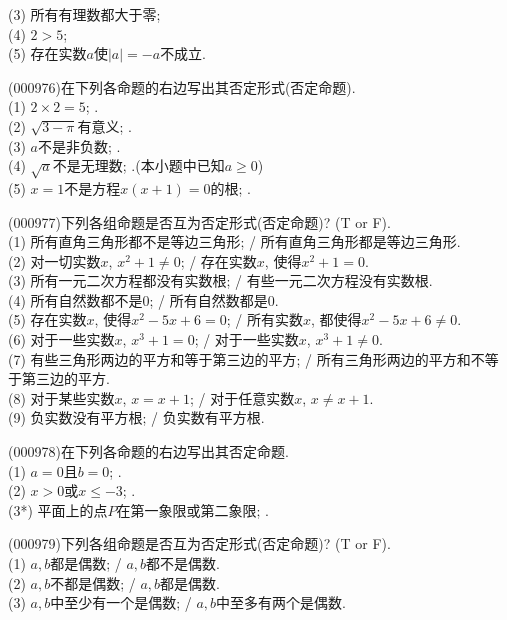  (3) 所有有理数都大于零;\\ 
 (4) $2>5$;\\ 
 (5) 存在实数$a$使$|a|=-a$不成立.
\item (000976)在下列各命题的右边写出其否定形式(否定命题).\\ 
(1) $2 \times 2 =5$; .\\ 
(2) $\sqrt{3-\pi}$有意义; .\\ 
(3) $a$不是非负数; .\\ 
(4) $\sqrt{a}$不是无理数; .(本小题中已知$a\ge 0$)\\ 
(5) $x=1$不是方程$x(x+1)=0$的根; .
\item (000977)下列各组命题是否互为否定形式(否定命题)? (T or F).\\ 
(1) 所有直角三角形都不是等边三角形; / 所有直角三角形都是等边三角形.\\ 
(2) 对一切实数$x$, $x^2+1 \ne 0$; / 存在实数$x$, 使得$x^2+1=0$.\\ 
(3) 所有一元二次方程都没有实数根; / 有些一元二次方程没有实数根.\\ 
(4) 所有自然数都不是$0$; / 所有自然数都是$0$.\\ 
(5) 存在实数$x$, 使得$x^2-5x+6=0$; / 所有实数$x$, 都使得$x^2-5x+6\ne 0$.\\ 
(6) 对于一些实数$x$, $x^3+1=0$; / 对于一些实数$x$, $x^3+1\ne 0$.\\ 
(7) 有些三角形两边的平方和等于第三边的平方; / 所有三角形两边的平方和不等于第三边的平方.\\ 
(8) 对于某些实数$x$, $x=x+1$; / 对于任意实数$x$, $x \ne x+1$.\\ 
(9) 负实数没有平方根; / 负实数有平方根.
\item (000978)在下列各命题的右边写出其否定命题.\\ 
(1) $a=0$且$b=0$; .\\ 
(2) $x>0$或$x \le -3$; .\\ 
(3*) 平面上的点$P$在第一象限或第二象限; .
\item (000979)下列各组命题是否互为否定形式(否定命题)? (T or F).\\ 
(1) $a,b$都是偶数; / $a,b$都不是偶数.\\ 
(2) $a,b$不都是偶数; / $a,b$都是偶数.\\ 
(3) $a,b$中至少有一个是偶数; / $a,b$中至多有两个是偶数.\\ 
